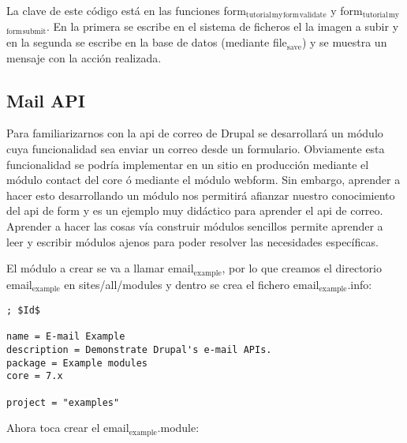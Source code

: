 \documentclass[11pt]{article}
\begin{document}
La clave de este código está en las funciones
form$_{\mathrm{tutorial}}$$_{\mathrm{my}}$$_{\mathrm{form}}$$_{\mathrm{validate}}$ y form$_{\mathrm{tutorial}}$$_{\mathrm{my}}$$_{\mathrm{form}}$$_{\mathrm{submit}}$. En la
primera se escribe en el sistema de ficheros el la imagen a subir y en
la segunda se escribe en la base de datos (mediante file$_{\mathrm{save}}$) y se
muestra un mensaje con la acción realizada.

\subsection{Mail API}
\label{sec-4.13}


Para familiarizarnos con la api de correo de Drupal se desarrollará un
módulo cuya funcionalidad sea enviar un correo desde un
formulario. Obviamente esta funcionalidad se podría implementar en un
sitio en producción mediante el módulo contact del core ó mediante el
módulo webform. Sin embargo, aprender a hacer esto desarrollando un
módulo nos permitirá afianzar nuestro conocimiento del api de form y
es un ejemplo muy didáctico para aprender el api de correo. Aprender a
hacer las cosas vía construir módulos sencillos permite aprender a
leer y escribir módulos ajenos para poder resolver las necesidades
específicas.

El módulo a crear se va a llamar email$_{\mathrm{example}}$, por lo que creamos el
directorio email$_{\mathrm{example}}$ en sites/all/modules y dentro se crea el
fichero email$_{\mathrm{example}}$.info:


\begin{verbatim}
; $Id$

name = E-mail Example
description = Demonstrate Drupal's e-mail APIs.
package = Example modules
core = 7.x

project = "examples"
\end{verbatim}



Ahora toca crear el email$_{\mathrm{example}}$.module:
\end{document}
